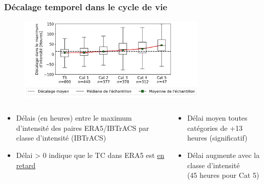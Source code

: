 \documentclass[aspectratio=169, usepdftitle=false, xcolor={dvipsnames}, 9pt,table]{beamer}
\begin{document}
\begin{frame}[t]
    \frametitle{Décalage temporel dans le cycle de vie}
    \begin{figure}
        \centering
        \includegraphics[width=0.8\textwidth]{Figures/lag_max_intensity_myVTU.png}
    \end{figure}
    \begin{columns}
        \footnotesize
        \setlength{\leftmargini}{3ex}
        \begin{column}{0.5\textwidth}
            \begin{examples}
                \begin{itemize}
                    \item Délais (en heures) entre le maximum d'intensité des paires ERA5/IBTrACS par classe d'intensité (IBTrACS)
                    \item Délai > 0 indique que le TC dans ERA5 est \underline{en retard}
                \end{itemize}
            \end{examples}
        \end{column}
        \begin{column}{0.5\textwidth}
            \begin{block} 
                \begin{itemize}
                    \item Délai moyen toutes catégories de \alert{+13 heures} (significatif)
                    \item Délai \alert{augmente} avec la classe d'intensité\\(45 heures pour Cat 5)
                \end{itemize}
            \end{block}
        \end{column}
    \end{columns}
\end{frame}
\end{document}
